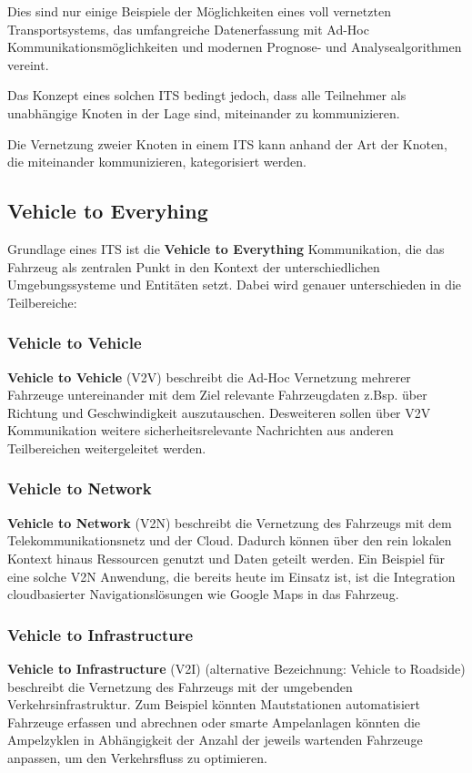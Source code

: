    Dies sind nur einige Beispiele der Möglichkeiten eines voll vernetzten Transportsystems, das umfangreiche Datenerfassung mit Ad-Hoc Kommunikationsmöglichkeiten und
    modernen Prognose- und Analysealgorithmen vereint.

    Das Konzept eines solchen ITS bedingt jedoch, dass alle Teilnehmer als unabhängige Knoten in der Lage sind, miteinander zu kommunizieren.

    Die Vernetzung zweier Knoten in einem ITS kann anhand der Art der Knoten, die miteinander kommunizieren, kategorisiert werden.

    \subsection{Vehicle to Everyhing}
    Grundlage eines ITS ist die \textbf{Vehicle to Everything} Kommunikation, die das Fahrzeug als zentralen Punkt in den
    Kontext der unterschiedlichen Umgebungssysteme und Entitäten setzt. Dabei wird genauer unterschieden in die Teilbereiche:
    
    \subsubsection{Vehicle to Vehicle}
    \textbf{Vehicle to Vehicle} (V2V) beschreibt die Ad-Hoc Vernetzung mehrerer Fahrzeuge untereinander mit dem Ziel relevante Fahrzeugdaten z.Bsp. über Richtung und Geschwindigkeit auszutauschen.
    Desweiteren sollen über V2V Kommunikation weitere sicherheitsrelevante Nachrichten aus anderen Teilbereichen weitergeleitet werden.

    \subsubsection{Vehicle to Network}
    \textbf{Vehicle to Network} (V2N) beschreibt die Vernetzung des Fahrzeugs mit dem Telekommunikationsnetz und der Cloud. Dadurch können über den
    rein lokalen Kontext hinaus Ressourcen genutzt und Daten geteilt werden. Ein Beispiel für eine solche V2N Anwendung, die bereits heute
    im Einsatz ist, ist die Integration cloudbasierter Navigationslösungen wie Google Maps in das Fahrzeug.
    
    \subsubsection{Vehicle to Infrastructure}
    \textbf{Vehicle to Infrastructure} (V2I) (alternative Bezeichnung: Vehicle to Roadside) beschreibt die Vernetzung des Fahrzeugs mit der umgebenden Verkehrsinfrastruktur. 
    Zum Beispiel könnten Mautstationen automatisiert Fahrzeuge erfassen und abrechnen oder smarte Ampelanlagen könnten die Ampelzyklen in Abhängigkeit
    der Anzahl der jeweils wartenden Fahrzeuge anpassen, um den Verkehrsfluss zu optimieren. 

